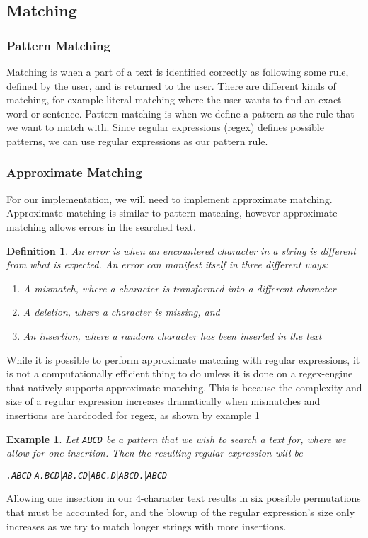 \documentclass[11pt,twoside,a4paper]{article}
\newtheorem{mydef}{Definition}
\newtheorem{myex}{Example}
\begin{document}
 \subsection{Matching}
  \subsubsection{Pattern Matching}
   Matching is when a part of a text is identified correctly as following some 
   rule, defined by the user, and is returned to the user. 
   There are different kinds of matching, for example literal matching where the 
   user wants to find an exact word or sentence. Pattern matching is when we define 
   a pattern as the rule that we want to match with. Since regular expressions %
   (regex) defines possible patterns, we can use regular expressions as our pattern rule.

  \subsubsection{Approximate Matching}
   For our implementation, we will need to implement 
   approximate matching. Approximate matching is similar to pattern matching, 
   however approximate matching allows errors in the searched text. 
   \begin{mydef}
    An error is when an encountered character in a string is different from 
    what is expected. An error can manifest itself in three different ways:
    \begin{enumerate}
    \item A mismatch, where a character is transformed into a different character
    \item A deletion, where a character is missing, and
    \item An insertion, where a random character has been inserted in the text
    \end{enumerate}
   \end{mydef}
   
   While it is possible to perform approximate matching with regular expressions, it is not 
   a computationally efficient thing to do unless it is done on a regex-engine 
   that natively supports approximate matching. This is because the complexity 
   and size of a regular expression increases dramatically when mismatches and 
   insertions are hardcoded for regex, as shown by example \ref{exInsert}
   \begin{myex}\label{exInsert}
   Let {\tt ABCD} be a pattern that we wish to search a text for, where we 
   allow for one insertion. Then the resulting regular expression will be \\
   \begin{center}
   {\tt .ABCD$|$A.BCD$|$AB.CD$|$ABC.D$|$ABCD.$|$ABCD}
   \end{center}
   \end{myex}
   Allowing one insertion in our 4-character text results in six possible 
   permutations that must be accounted for, and the blowup of the regular 
   expression's size only increases as we try to match longer strings with more 
   insertions.
  
  
\end{document}
